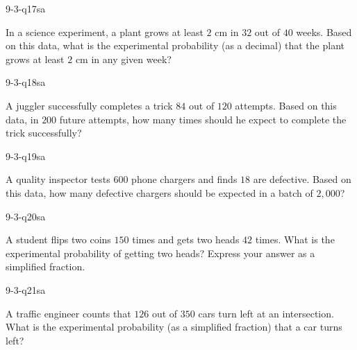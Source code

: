 \begin{practiceQuestion}{9-3-q17}{sa}
\begin{questionText}
In a science experiment, a plant grows at least $2$ cm in $32$ out of $40$ weeks. Based on this data, what is the experimental probability (as a decimal) that the plant grows at least $2$ cm in any given week?
\end{questionText}
\end{practiceQuestion}

\begin{practiceQuestion}{9-3-q18}{sa}
\begin{questionText}
A juggler successfully completes a trick $84$ out of $120$ attempts. Based on this data, in $200$ future attempts, how many times should he expect to complete the trick successfully?
\end{questionText}
\end{practiceQuestion}

\begin{practiceQuestion}{9-3-q19}{sa}
\begin{questionText}
A quality inspector tests $600$ phone chargers and finds $18$ are defective. Based on this data, how many defective chargers should be expected in a batch of $2{,}000$?
\end{questionText}
\end{practiceQuestion}

\begin{practiceQuestion}{9-3-q20}{sa}
\begin{questionText}
A student flips two coins $150$ times and gets two heads $42$ times. What is the experimental probability of getting two heads? Express your answer as a simplified fraction.
\end{questionText}
\end{practiceQuestion}

\begin{practiceQuestion}{9-3-q21}{sa}
\begin{questionText}
A traffic engineer counts that $126$ out of $350$ cars turn left at an intersection. What is the experimental probability (as a simplified fraction) that a car turns left?
\end{questionText}
\end{practiceQuestion}

